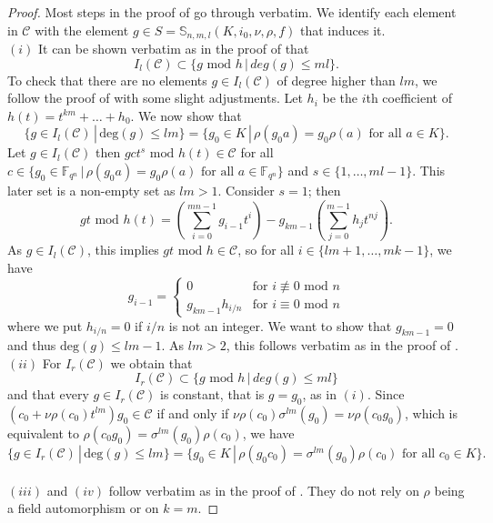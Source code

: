 \documentclass[12pt]{amsart}
\theoremstyle{plain}
\theoremstyle{definition}
\numberwithin{equation}{section}
\numberwithin{figure}{section}
\begin{document}
\begin{proof}
Most steps in the proof of \cite[Proposition 5.5]{NewS} go through verbatim.
We identify each element in $\mathcal{C}$ with the element $g\in  S=\mathbb{S}_{n,m,l}(K,i_0,\nu,\rho, f)$ that induces it.
 \\ $(i)$ It can be shown verbatim as in  the proof of \cite[Proposition 5.5]{NewS} that
$$ I_l(\mathcal{C})\subset  \lbrace   g \text{ mod }h\,|\, deg(g)\leq ml\rbrace.$$
To check that there are no elements $g\in I_l(\mathcal{C})$ of degree higher than $lm$, we follow the proof of \cite[Proposition 5.5]{NewS} with some slight adjustments. Let $h_i$ be the $i$th coefficient of  $h(t)=t^{km}+\dots+h_0$.
We now show that
$$\lbrace g\in I_l(\mathcal{C}) \,|\, \text{deg}(g)\leq lm\rbrace= \lbrace g_0\in K \,|\, \rho(g_0 a) = g_0\rho(a)  \text{ for all } a\in K\rbrace.$$
Let $g\in I_l(\mathcal{C})$ then $gct^s  \text{ mod } h(t)
 \in \mathcal{C}$ for all $c\in \lbrace g_0\in \mathbb{F}_{q^n} \,|\, \rho(g_0 a) = g_0\rho(a)  \text{ for all } a\in \mathbb{F}_{q^n}\rbrace$ and $s\in \{1,\dots , {ml-1}\}$. This later set is a non-empty set as $lm>1.$
 Consider $s=1$; then 
 $$gt \text{ mod } h(t)=\left(\sum_{i=0}^{mn-1}g_{i-1}t^i\right)-g_{km-1}\left(\sum_{j=0}^{m-1}h_jt^{nj}\right).$$
As $g\in I_l(\mathcal{C})$, this implies $gt \text{ mod } h\in \mathcal{C}$, so for all $i\in\lbrace lm+1,\dots, mk-1\rbrace$, we have
\begin{equation}\label{eqn:nucleus g_i}
g_{i-1}=\begin{cases}
0& \text{for } i\not\equiv 0\text{ mod }n\\
g_{km-1}h_{i/n}& \text{for } i\equiv 0\text{ mod }n
\end{cases}
\end{equation}
where we put $h_{i/n}=0$ if $i/n$ is not an integer. We want to show that $g_{km-1}=0$ and thus $\text{deg}(g)\leq lm-1$. As $lm>2$, this follows verbatim as in the proof of \cite[Proposition 5.5]{NewS}.
\\ $(ii)$
For $I_r(\mathcal{C})$  we obtain that
$$I_r(\mathcal{C})\subset  \lbrace   g \text{ mod }h\,|\, deg(g)\leq ml\rbrace$$
and that  every $g\in I_r(\mathcal{C})$   is constant, that is $g=g_0$, as in $(i)$.
Since $(c_0+\nu\rho(c_0)t^{lm}) g_0 \in \mathcal{C}$ if and only if $\nu\rho(c_0) \sigma^{lm}(g_0)=\nu\rho(c_0g_0)$, which is equivalent to $\rho(c_0g_0)= \sigma^{lm}(g_0) \rho(c_0) $, we have
$$\lbrace g\in I_r(\mathcal{C}) \,|\, \text{deg}(g)\leq lm\rbrace= \lbrace g_0\in K \,|\, \rho(g_0 c_0) = \sigma^{lm}(g_0)\rho(c_0)
\text{ for all } c_0\in K \rbrace.$$
\\ $(iii)$ and $(iv)$ follow verbatim  as in the proof of \cite[Theorem 9]{Sheekey}.
They do not rely on $\rho$ being a field automorphism or on $k=m$.
\end{proof}
\end{document}
